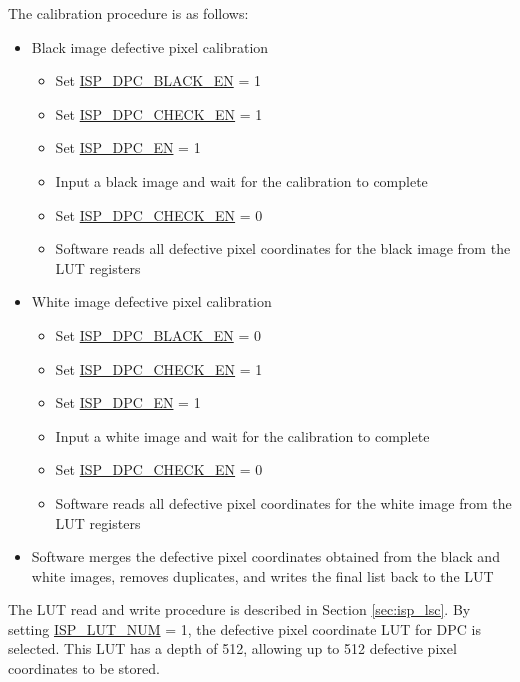 \documentclass[main\_\_EN.tex]{subfiles}
\begin{document}
The calibration procedure is as follows:
\begin{itemize}
    \item Black image defective pixel calibration
        \begin{itemize}
            \item Set \hyperref[fielddesc:ISPDPCBLACKEN]{ISP\_DPC\_BLACK\_EN} = 1
            \item Set \hyperref[fielddesc:ISPDPCCHECKEN]{ISP\_DPC\_CHECK\_EN} = 1
            \item Set \hyperref[fielddesc:ISPDPCEN]{ISP\_DPC\_EN} = 1
            \item Input a black image and wait for the calibration to complete
            \item Set \hyperref[fielddesc:ISPDPCCHECKEN]{ISP\_DPC\_CHECK\_EN} = 0
            \item Software reads all defective pixel coordinates for the black image from the LUT registers
        \end{itemize}

    \item White image defective pixel calibration
        \begin{itemize}
            \item Set \hyperref[fielddesc:ISPDPCBLACKEN]{ISP\_DPC\_BLACK\_EN} = 0
            \item Set \hyperref[fielddesc:ISPDPCCHECKEN]{ISP\_DPC\_CHECK\_EN} = 1
            \item Set \hyperref[fielddesc:ISPDPCEN]{ISP\_DPC\_EN} = 1
            \item Input a white image and wait for the calibration to complete
            \item Set \hyperref[fielddesc:ISPDPCCHECKEN]{ISP\_DPC\_CHECK\_EN} = 0
            \item Software reads all defective pixel coordinates for the white image from the LUT registers
        \end{itemize}

    \item Software merges the defective pixel coordinates obtained from the black and white images, removes duplicates, and writes the final list back to the LUT
\end{itemize}

The LUT read and write procedure is described in Section \ref{sec:isp_lsc}. By setting \hyperref[fielddesc:ISPLUTNUM]{ISP\_LUT\_NUM} = 1, the defective pixel coordinate LUT for DPC is selected. This LUT has a depth of 512, allowing up to 512 defective pixel coordinates to be stored.
\end{document}
